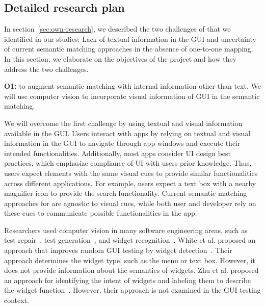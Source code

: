 \subsection{Detailed research plan}
\label{sec:detailed-plan}

In section~\ref{sec:own-research}, we described the two challenges of \testreuse that we identified in our studies:
Lack of textual information in the GUI and uncertainty of current semantic matching approaches in the absence of one-to-one mapping. 
In this section, we elaborate on the objectives of the \project project and how they address the two challenges.

\bigskip
\noindent
\textbf{O1:} to augment semantic matching with internal information other than text.  
We will use computer vision to incorporate visual information of GUI in the semantic matching.  

\bigskip
We will overcome the first challenge by using  textual and visual information available in the GUI.
Users interact with apps by relying on  textual and visual information in the GUI to navigate through app windows and execute their intended functionalities. 
Additionally, most apps consider UI design best practices, which emphasize compliance of UI with users prior knowledge.  
 Thus, users expect elements with the same visual cues to provide similar functionalities across different applications.
For example, users expect a text box with a nearby magnifier icon to provide  the search functionality.
Current semantic matching approaches for \testreuse are agnostic to visual cues, while both user and developer rely on these cues to communicate possible functionalities in the app. 



\bigskip
{}
Researchers used computer vision in many software engineering areas, such as test repair~\cite{Stocco:VisualRepair:FSE:2018,Pan:Meter:TSE:2022,Xu:GUIDER:ISSTA:2021},  test generation~\cite{YazdaniBanafsheDaragh:DEEPGUI:ASE:2021,Li:Humanoid:ASE:2019,Hu:appflow:FSE:2018}, and widget recognition~\cite{zhu2021widgetrecog, white:WidgetDetection:ISSTA:2019}.
White et al. proposed an approach that improves random GUI testing by widget detection~\cite{white:WidgetDetection:ISSTA:2019}. 
Their approach determines the widget type, such as the menu or text box. However, it does not provide information about the semantics of widgets.
Zhu et al. proposed an approach for identifying the intent of widgets and labeling them to describe the widget function~\cite{zhu2021widgetrecog}. 
However, their approach is not examined in the GUI testing context. 


